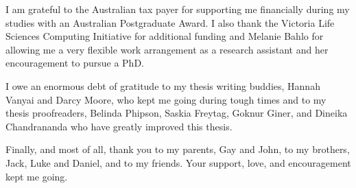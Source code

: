 \documentclass[11pt,a4paper,oneside]{book}	%
\begin{document}
I am grateful to the Australian tax payer for supporting me financially during my studies with an Australian Postgraduate Award. I also thank the Victoria Life Sciences Computing Initiative for additional funding and Melanie Bahlo for allowing me a very flexible work arrangement as a research assistant and her encouragement to pursue a PhD.

I owe an enormous debt of gratitude to my thesis writing buddies, Hannah Vanyai and Darcy Moore, who kept me going during tough times and to my thesis proofreaders, Belinda Phipson, Saskia Freytag, Goknur Giner, and Dineika Chandrananda who have greatly improved this thesis.

Finally, and most of all, thank you to my parents, Gay and John, to my brothers, Jack, Luke and Daniel, and to my friends. Your support, love, and encouragement kept me going.

\tableofcontents

\listoffigures

\listoftables

\mainmatter











\backmatter



\end{document}
